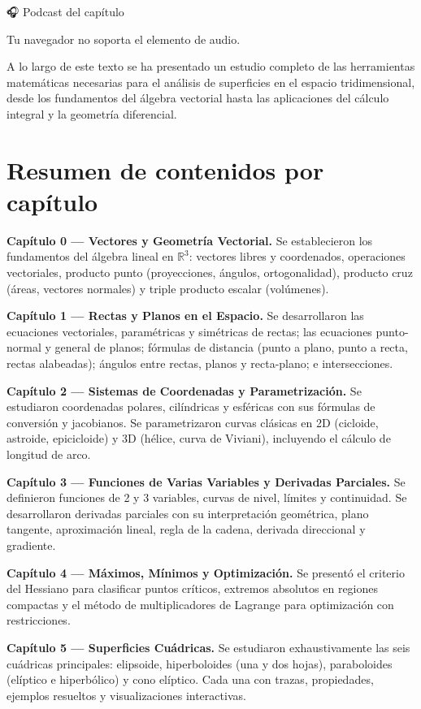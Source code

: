\documentclass[
]{book}
\begin{document}
🎧 Podcast del capítulo

Tu navegador no soporta el elemento de audio.

A lo largo de este texto se ha presentado un estudio completo de las herramientas matemáticas necesarias para el análisis de superficies en el espacio tridimensional, desde los fundamentos del álgebra vectorial hasta las aplicaciones del cálculo integral y la geometría diferencial.

\section{Resumen de contenidos por capítulo}\label{resumen-de-contenidos-por-capuxedtulo}

\textbf{Capítulo 0 --- Vectores y Geometría Vectorial.} Se establecieron los fundamentos del álgebra lineal en \(\mathbb{R}^3\): vectores libres y coordenados, operaciones vectoriales, producto punto (proyecciones, ángulos, ortogonalidad), producto cruz (áreas, vectores normales) y triple producto escalar (volúmenes).

\textbf{Capítulo 1 --- Rectas y Planos en el Espacio.} Se desarrollaron las ecuaciones vectoriales, paramétricas y simétricas de rectas; las ecuaciones punto-normal y general de planos; fórmulas de distancia (punto a plano, punto a recta, rectas alabeadas); ángulos entre rectas, planos y recta-plano; e intersecciones.

\textbf{Capítulo 2 --- Sistemas de Coordenadas y Parametrización.} Se estudiaron coordenadas polares, cilíndricas y esféricas con sus fórmulas de conversión y jacobianos. Se parametrizaron curvas clásicas en 2D (cicloide, astroide, epicicloide) y 3D (hélice, curva de Viviani), incluyendo el cálculo de longitud de arco.

\textbf{Capítulo 3 --- Funciones de Varias Variables y Derivadas Parciales.} Se definieron funciones de 2 y 3 variables, curvas de nivel, límites y continuidad. Se desarrollaron derivadas parciales con su interpretación geométrica, plano tangente, aproximación lineal, regla de la cadena, derivada direccional y gradiente.

\textbf{Capítulo 4 --- Máximos, Mínimos y Optimización.} Se presentó el criterio del Hessiano para clasificar puntos críticos, extremos absolutos en regiones compactas y el método de multiplicadores de Lagrange para optimización con restricciones.

\textbf{Capítulo 5 --- Superficies Cuádricas.} Se estudiaron exhaustivamente las seis cuádricas principales: elipsoide, hiperboloides (una y dos hojas), paraboloides (elíptico e hiperbólico) y cono elíptico. Cada una con trazas, propiedades, ejemplos resueltos y visualizaciones interactivas.
\end{document}
